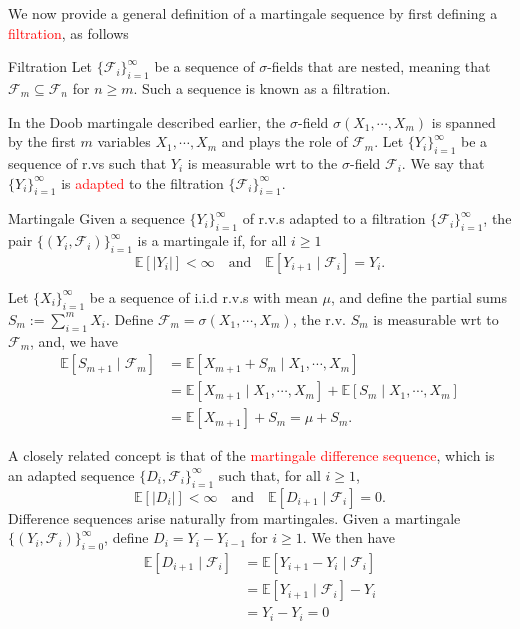 \documentclass[10pt,handout,english]{beamer}
\newcommand{\E}{\mathbb{E}}
\newcommand{\F}{\mathcal{F}}
\begin{document}
\begin{frame}[allowframebreaks]
We now provide a general definition of a martingale sequence by first defining a \textcolor{red}{filtration}, as follows
\begin{block}{Filtration}
Let $\{\F_i\}_{i=1}^{\infty}$ be a sequence of $\sigma$-fields that are nested, meaning that $\F_{m}\subseteq\F_{n}$ for $n\geq m$. Such a sequence is known as a filtration.
\end{block}
In the Doob martingale described earlier, the $\sigma$-field $\sigma(X_1,\cdots,X_m)$ is spanned by the first $m$ variables $X_1,\cdots,X_m$ and plays the role of $\F_m$. Let $\{Y_i\}_{i=1}
^{\infty}$ be a sequence of r.vs such that $Y_i$ is measurable wrt to the $\sigma$-field $\F_{i}$. We say that $\{Y_i\}_{i=1}^{\infty}$ is \textcolor{red}{adapted} to the filtration $\{\F_{i}\}_{i=1}^{\infty}$. 
\begin{block}{Martingale}
Given a sequence $\{Y_{i}\}_{i=1}^{\infty}$ of r.v.s adapted to a filtration $\{\F_i\}_{i=1}^{\infty}$, the pair $\{(Y_i,\F_i)\}_{i=1}^{\infty}$ is a martingale if, for all $i\geq 1$
\[
\E[\lvert Y_i\rvert]<\infty\quad\text{and}\quad\E[Y_{i+1}\mid\F_{i}]=Y_{i}.
\]
\end{block}
\begin{example}
Let $\{X_i\}_{i=1}^{\infty}$ be a sequence of i.i.d r.v.s with mean $\mu$, and define the partial sums $S_m:=\sum\limits_{i=1}^mX_i$. Define $\F_{m}=\sigma(X_1,\cdots,X_m)$, the r.v. $S_m$ is measurable wrt to $\F_m$, and, we have
\begin{align*}
\E[S_{m+1}\mid \F_{m}]&=\E[X_{m+1}+S_{m}\mid X_1,\cdots,X_m ]\\
&=\E[X_{m+1}\mid X_1,\cdots,X_m]+\E[S_{m}\mid X_1,\cdots,X_m ]\\
&=\E[X_{m+1}]+S_m=\mu+S_m.
\end{align*}
\end{example}
A closely related concept is that of the \textcolor{red}{martingale difference sequence}, which is an adapted sequence $\{D_i,\F_{i}\}_{i=1}^{\infty}$ such that, for all $i\geq 1$,
\[
\E[\lvert D_i\rvert]<\infty\quad\text{and}\quad\E[D_{i+1}\mid\F_{i}]=0.
\] 
Difference sequences arise naturally from martingales. Given a martingale $\{(Y_i,\F_{i})\}_{i=0}^{\infty}$, define $D_i=Y_i-Y_{i-1}$ for $i\geq 1$. We then have
\begin{align*}
\E[D_{i+1}\mid\F_{i}]&=\E[Y_{i+1}-Y_{i}\mid\F_i]\\
&=\E[Y_{i+1}\mid\F_i]-Y_i\\
&=Y_i-Y_i=0
\end{align*}

\end{frame}
\end{document}
